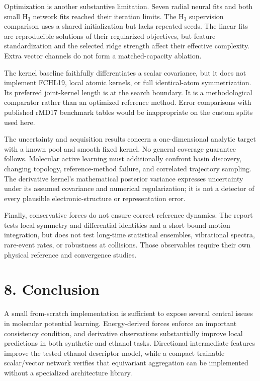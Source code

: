 \documentclass[
  11pt,
  a4paper,
]{article}
\begin{document}
Optimization is another substantive limitation. Seven radial neural fits
and both small H\(_3\) network fits reached their iteration limits. The
H\(_3\) supervision comparison uses a shared initialization but lacks
repeated seeds. The linear fits are reproducible solutions of their
regularized objectives, but feature standardization and the selected
ridge strength affect their effective complexity. Extra vector channels
do not form a matched-capacity ablation.

The kernel baseline faithfully differentiates a scalar covariance, but
it does not implement FCHL19, local atomic kernels, or full
identical-atom symmetrization. Its preferred joint-kernel length is at
the search boundary. It is a methodological comparator rather than an
optimized reference method. Error comparisons with published rMD17
benchmark tables would be inappropriate on the custom splits used here.

The uncertainty and acquisition results concern a one-dimensional
analytic target with a known pool and smooth fixed kernel. No general
coverage guarantee follows. Molecular active learning must additionally
confront basin discovery, changing topology, reference-method failure,
and correlated trajectory sampling. The derivative kernel's mathematical
posterior variance expresses uncertainty under its assumed covariance
and numerical regularization; it is not a detector of every plausible
electronic-structure or representation error.

Finally, conservative forces do not ensure correct reference dynamics.
The report tests local symmetry and differential identities and a short
bound-motion integration, but does not test long-time statistical
ensembles, vibrational spectra, rare-event rates, or robustness at
collisions. Those observables require their own physical reference and
convergence studies.

\hypertarget{conclusion}{%
\section{8. Conclusion}\label{conclusion}}

A small from-scratch implementation is sufficient to expose several
central issues in molecular potential learning. Energy-derived forces
enforce an important consistency condition, and derivative observations
substantially improve local predictions in both synthetic and ethanol
tasks. Directional intermediate features improve the tested ethanol
descriptor model, while a compact trainable scalar/vector network
verifies that equivariant aggregation can be implemented without a
specialized architecture library.
\end{document}
